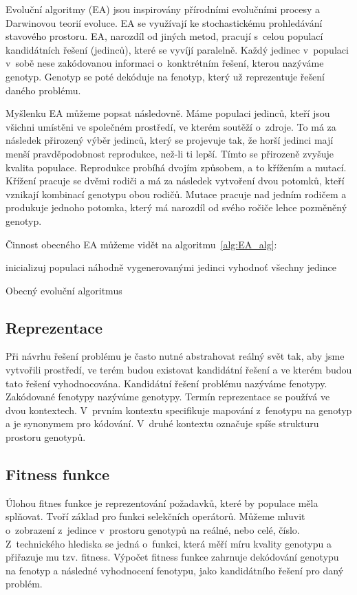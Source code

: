 Evoluční algoritmy (EA) jsou inspirovány přírodními evolučními procesy a Darwinovou teorií evoluce.
EA se využívají ke stochastickému prohledávání stavového prostoru.
EA, narozdíl od jiných metod, pracují s~celou populací kandidátních řešení (jedinců), které se vyvíjí paralelně.
Každý jedinec v~populaci v~sobě nese zakódovanou informaci o~konktrétním řešení, kterou nazýváme genotyp.
Genotyp se poté dekóduje na fenotyp, který už reprezentuje řešení daného problému.

Myšlenku EA můžeme popsat následovně.
Máme populaci jedinců, kteří jsou všichni umístěni ve společném prostředí, ve kterém soutěží o~zdroje.
To má za následek přirozený výběr jedinců, který se projevuje tak, že horší jedinci mají menší pravděpodobnost reprodukce, než-li ti lepší.
Tímto se přirozeně zvyšuje kvalita populace.
Reprodukce probíhá dvojím způsobem, a to křížením a mutací.
Křížení pracuje se dvěmi rodiči a má za následek vytvoření dvou potomků, kteří vznikají kombinací genotypu obou rodičů.
Mutace pracuje nad jedním rodičem a produkuje jednoho potomka, který má narozdíl od svého ročiče lehce pozměněný genotyp.

Činnost obecného EA můžeme vidět na algoritmu~\ref{alg:EA_alg}:


\begin{algorithm}[H]
    inicializuj populaci náhodně vygenerovanými jedinci\;
    vyhodnoť všechny jedince\;
    \caption{Obecný evoluční algoritmus}
    \label{alg:EA_alg}
\end{algorithm}

\subsection{Reprezentace}
Při návrhu řešení problému je často nutné abstrahovat reálný svět tak, aby jsme vytvořili prostředí, ve terém budou existovat kandidátní řešení a ve kterém budou tato řešení vyhodnocována.
Kandidátní řešení problému nazýváme fenotypy.
Zakódované fenotypy nazýváme genotypy.
Termín reprezentace se používá ve dvou kontextech.
V~prvním kontextu specifikuje mapování z~fenotypu na genotyp a je synonymem pro kódování.
V~druhé kontextu označuje spíše strukturu prostoru genotypů.

\subsection{Fitness funkce}
Úlohou fitnes funkce je reprezentování požadavků, které by populace měla splňovat.
Tvoří základ pro funkci selekčních operátorů.
Můžeme mluvit o~zobrazení z~jedince v~prostoru genotypů na reálné, nebo celé, číslo.
Z~technického hlediska se jedná o~funkci, která měří míru kvality genotypu a přiřazuje mu tzv. fitness.
Výpočet fitness funkce zahrnuje dekódování genotypu na fenotyp a následné vyhodnocení fenotypu, jako kandidátního řešení pro daný problém.

